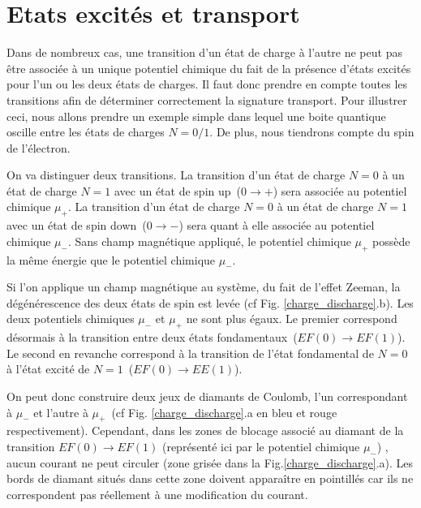 


\section{Etats excités et transport}

Dans de nombreux cas, une transition d'un état de charge à l'autre ne peut pas être associée à un unique potentiel chimique du fait de la présence d'états excités pour l'un ou les deux états de charges. Il faut donc prendre en compte toutes les transitions afin de déterminer correctement la signature transport. Pour illustrer ceci, nous allons prendre un exemple simple dans lequel une boite quantique oscille entre les états de charges $N=0/1$. De plus, nous tiendrons compte du spin de l'électron. 

On va distinguer deux transitions. La transition d'un état de charge $N=0$ à un état de charge $N=1$ avec un état de spin up~($0\rightarrow +$) sera associée au potentiel chimique $\mu_{+}$. La transition d'un état de charge $N=0$ à un état de charge $N=1$ avec un état de spin down~($0\rightarrow -$) sera quant à elle associée au potentiel chimique $\mu_{-}$. Sans champ magnétique appliqué, le potentiel chimique $\mu_{+}$ possède la m\^eme énergie que le potentiel chimique  $\mu_{-}$.

Si l'on applique un champ magnétique au système, du fait de l'effet Zeeman, la dégénérescence des deux états de spin est levée (cf Fig. \ref{charge_discharge}.b). Les deux potentiels chimiques $\mu_{-}$ et $\mu_{+}$ ne sont plus égaux. Le premier correspond désormais à la transition entre deux états fondamentaux~($EF(0)\rightarrow EF(1)$). Le second en revanche correspond à la transition de l'état fondamental de $N=0$ à l'état excité de $N=1$~($EF(0)\rightarrow EE(1)$).

On peut donc construire deux jeux de diamants de Coulomb, l'un correspondant à $\mu_{-}$ et l'autre à $\mu_{+}$~(cf Fig. \ref{charge_discharge}.a en bleu et rouge respectivement). Cependant, dans les zones de blocage associé au diamant de la transition $EF(0)\rightarrow EF(1)$ (représenté ici par le potentiel chimique $\mu_{-}$) , aucun courant ne peut circuler (zone grisée dans la Fig.\ref{charge_discharge}.a). Les bords de diamant situés dans cette zone doivent apparaître en pointillés car ils ne correspondent pas réellement à une modification du courant.

